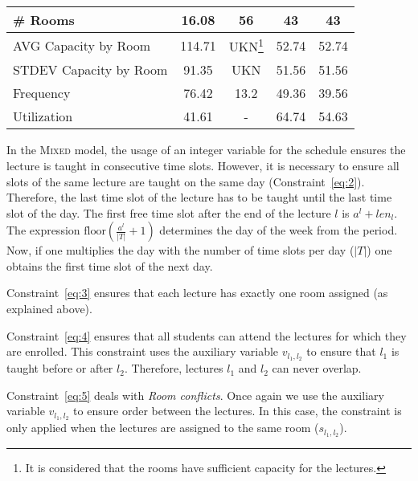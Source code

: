\documentclass[twocolumn,natbib]{svjour3}          %
\newcounter{constraint}
\begin{document}
\begin{table*}[!h]
\begin{minipage}{\textwidth}
{\begin{tabular}{|l||c|c|c|c|}
\# Rooms                          & 16.08   & 56          & 43               & 43               \\ \hline
AVG Capacity by Room                                & 114.71   & UKN\footnote{It is considered that the rooms have sufficient capacity for the lectures.}       & 52.74            & 52.74            \\ \hline
STDEV Capacity by Room                      & 91.35  & UKN          & 51.56            & 51.56            \\ \hline
Frequency                                              & 76.42   & 13.2          & 49.36            & 39.56            \\ \hline
Utilization                                              & 41.61    & -        & 64.74            & 54.63            \\ \hline

\end{tabular}}

\end{minipage}
\end{table*}

In the \textsc{Mixed} model, the usage of an integer variable for the schedule ensures the lecture is taught in consecutive time slots. However, it is necessary to ensure all slots of the same lecture are taught on the same day (Constraint~\ref{eq:2}). Therefore, the last time slot of the lecture has to be taught until the last time slot of the day. The first free time slot after the end of the lecture $l$ is $a^l +len_l$. The expression $\textrm{floor} (\frac{a^l}{|T|}+1)$ determines the day of the week from the period.  Now, if one multiplies the day with the number of time slots per day ($|T|$) one obtains the first time slot of the next day. 


Constraint~\ref{eq:3} ensures that each lecture has exactly one room assigned (as explained above).  

Constraint~\ref{eq:4} ensures that all students can attend the lectures for which they are enrolled. This constraint uses the auxiliary variable $v_{l_1,l_2}$ to ensure that $l_1$ is taught before or after $l_2$. Therefore, lectures $l_1$ and $l_2$ can never overlap.

Constraint~\ref{eq:5} deals with {\em Room conflicts}. Once again we use the auxiliary variable $v_{l_1,l_2}$ to ensure order between the lectures.  In this case, the constraint is only applied when the lectures are assigned to the same room ($s_{l_1,l_2}$). 
\end{document}
